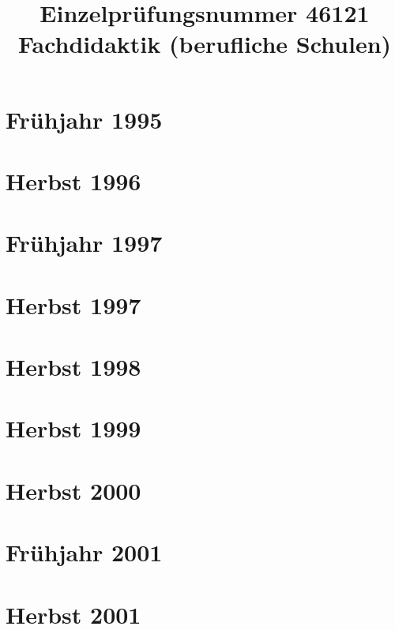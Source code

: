 \documentclass{lehramt-informatik-examen-sammlung}
\title{Einzelprüfungsnummer 46121\\Fachdidaktik (berufliche Schulen)}
\begin{document}
\maketitle
\tableofcontents

\section{Frühjahr 1995}


\section{Herbst 1996}


\section{Frühjahr 1997}


\section{Herbst 1997}


\section{Herbst 1998}


\section{Herbst 1999}


\section{Herbst 2000}


\section{Frühjahr 2001}


\section{Herbst 2001}

\end{document}
